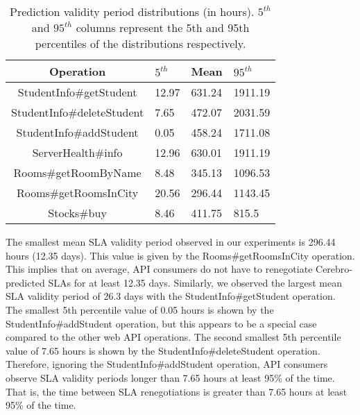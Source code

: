\begin{table}
\begin{center}
\begin{tabular}{|c|p{1cm}|p{1cm}|p{1cm}|}
\hline
Operation & $5^{th}$ & Mean & $95^{th}$ \\ \hline
StudentInfo\#getStudent & 12.97 & 631.24 & 1911.19 \\ \hline
StudentInfo\#deleteStudent & 7.65 & 472.07 & 2031.59 \\ \hline
StudentInfo\#addStudent & 0.05 & 458.24 & 1711.08 \\ \hline
ServerHealth\#info & 12.96 & 630.01 & 1911.19 \\ \hline
Rooms\#getRoomByName & 8.48 & 345.13 & 1096.53 \\ \hline
Rooms\#getRoomsInCity & 20.56 & 296.44 & 1143.45 \\ \hline
Stocks\#buy & 8.46 & 411.75 & 815.5 \\ \hline
\end{tabular}
\end{center}
\caption{Prediction validity period distributions (in hours).
$5^{th}$ and $95^{th}$ 
columns represent the 5th and 95th percentiles of the
distributions respectively.
\label{tab:validity_periods}
}
\vspace{-0.3in}
\end{table}

The smallest
mean SLA validity period observed in our experiments is 296.44 hours (12.35 days). This value is given by the
Rooms\#getRoomsInCity operation. 
This implies that on average, API consumers do not have to renegotiate Cerebro-predicted SLAs
for at least 12.35 days. Similarly, we observed the largest mean SLA validity period of 26.3 days with the
StudentInfo\#getStudent operation.
The smallest 5th percentile value of 0.05 hours is shown by
the StudentInfo\#addStudent operation, but this appears to be a special case compared to the other web API
operations. The second smallest 5th percentile value of 7.65 hours is shown by the 
StudentInfo\#deleteStudent operation. Therefore, ignoring the StudentInfo\#addStudent operation, API
consumers observe SLA validity periods longer than 7.65 hours at least 95\% of the time. That is, the time
between SLA renegotiations is greater than 7.65 hours at least 95\% of the time.

